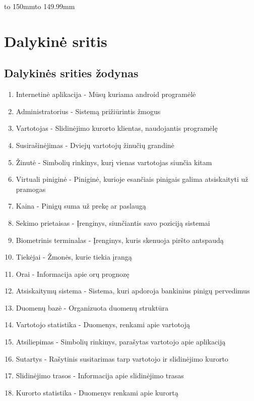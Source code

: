 \documentclass[oneside]{VUMIFPSkursinis}
\begin{document}
\hbox to 150mm{\hbox to 149.99mm{}}

\section{Dalykinė sritis}
\subsection{Dalykinės srities žodynas}

\begin{enumerate}
	\item Internetinė aplikacija - Mūsų kuriama android programėlė
	\item Administratorius - Sistemą prižiūrintis žmogus
	\item Vartotojas - Slidinėjimo kurorto klientas, naudojantis programėlę
	\item Susirašinėjimas - Dviejų vartotojų žinučių grandinė
	\item Žinutė - Simbolių rinkinys, kurį vienas vartotojas siunčia kitam
	\item Virtuali piniginė - Piniginė, kurioje esančiais pinigais galima atsiskaityti už pramogas
	\item Kaina - Pinigų suma už prekę ar paslaugą
	\item Sekimo prietaisas - Įrenginys, siunčiantis savo poziciją sistemai
	\item Biometrinis terminalas - Įrenginys, kuris skenuoja piršto antspaudą
	\item Tiekėjai - Žmonės, kurie tiekia įrangą
	\item Orai - Informacija apie orų prognozę
	\item Atsiskaitymų sistema - Sistema, kuri apdoroja bankinius pinigų pervedimus
	\item Duomenų bazė - Organizuota duomenų struktūra
	\item Vartotojo statistika - Duomenys, renkami apie vartotoją
	\item Atsiliepimas - Simbolių rinkinys, parašytas vartotojo apie aplikaciją
	\item Sutartys - Rašytinis susitarimas tarp vartotojo ir slidinėjimo kurorto
	\item Slidinėjimo trasos - Informacija apie slidinėjimo trasas
	\item Kurorto statistika - Duomenys renkami apie kurortą
\end{enumerate}
\pagebreak
\end{document}
